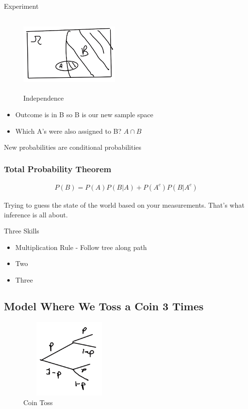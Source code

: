 \documentclass{article}
\begin{document}
Experiment

\begin{figure}[ht]
\centering
\includegraphics[width=5cm, height=4cm]{images/L03/independence.jpeg}
\caption{Independence}
\end{figure}

\begin{itemize}
    \item Outcome is in B so B is our new sample space
    \item Which A's were also assigned to B? $A \cap B$
\end{itemize}

New probabilities are conditional probabilities

\subsubsection*{Total Probability Theorem}

\begin{align*}
P(B)=P(A)P(B|A) + P(A^c)P(B|A^c)
\end{align*}

 Trying to guess the state of the world based on your measurements.  That's what inference is all about.


Three Skills
\begin{itemize}
    \item Multiplication Rule - Follow tree along path
    \item Two
    \item Three
\end{itemize}

\subsection{Model Where We Toss a Coin 3 Times}

\begin{figure}[!ht]
\centering
\includegraphics[width=5cm, height=4cm]{images/L03/coin_toss3.jpeg}
\caption{Coin Toss}
\end{figure}
\end{document}
